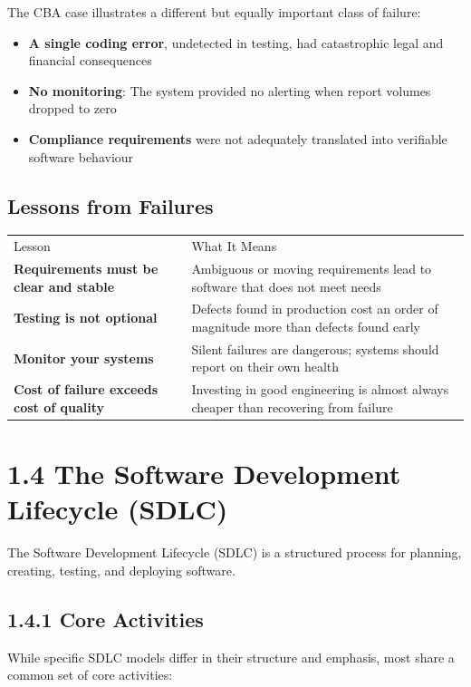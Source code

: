 \documentclass[11pt,a4paper]{book}
\begin{document}
The CBA case illustrates a different but equally important class of failure:

\begin{itemize}
  \item \textbf{A single coding error}, undetected in testing, had catastrophic legal and financial consequences
  \item \textbf{No monitoring}: The system provided no alerting when report volumes dropped to zero
  \item \textbf{Compliance requirements} were not adequately translated into verifiable software behaviour
\end{itemize}

\subsection{Lessons from Failures}

\begin{tabular}{ll}
\hline
Lesson & What It Means \\
\textbf{Requirements must be clear and stable} & Ambiguous or moving requirements lead to software that does not meet needs \\
\textbf{Testing is not optional} & Defects found in production cost an order of magnitude more than defects found early \\
\textbf{Monitor your systems} & Silent failures are dangerous; systems should report on their own health \\
\textbf{Cost of failure exceeds cost of quality} & Investing in good engineering is almost always cheaper than recovering from failure \\
\hline
\end{tabular}

\medskip

\section{1.4 The Software Development Lifecycle (SDLC)}

The Software Development Lifecycle (SDLC) is a structured process for planning, creating, testing, and deploying software.

\subsection{1.4.1 Core Activities}

While specific SDLC models differ in their structure and emphasis, most share a common set of core activities:
\end{document}
